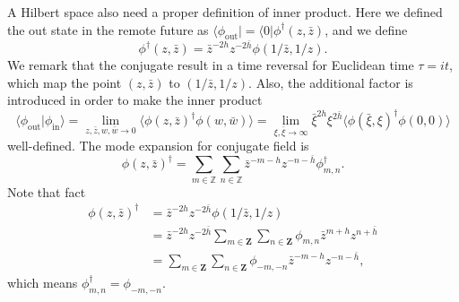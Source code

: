 \documentclass[aps,prb,superscriptaddress,nofootinbib]{revtex4}
\begin{document}
A Hilbert space also need a proper definition of inner product.
Here we defined the out state in the remote future as $\langle\phi_{\mathrm{out}}| = \langle 0| \phi^\dagger(z,\bar z)$, and we define
\begin{equation}
	\phi^\dagger(z,\bar z) =  \bar z^{-2h} z^{-2\bar h} \phi\left(1/\bar z, 1/z\right).
\end{equation}
We remark that the conjugate result in a time reversal for Euclidean time $\tau = it$, which map the point $(z,\bar z)$ to $(1/\bar z, 1/z)$.
Also, the additional factor is introduced in order to make the inner product
\begin{equation}
	\langle \phi_{\mathrm{out}}|\phi_{\mathrm{in}}\rangle = \lim_{z,\bar z,w,\bar w \rightarrow 0} \langle \phi(z,\bar z)^\dagger \phi(w,\bar w)\rangle
	= \lim_{\xi,\bar \xi\rightarrow \infty} \bar\xi^{2h}\xi^{2\bar h} \langle \phi(\bar\xi,\xi)^\dagger \phi(0,0)\rangle
\end{equation}
well-defined.
The mode expansion for conjugate field is
\begin{equation}
	\phi(z, \bar{z})^{\dagger}=\sum_{m \in \mathbb{Z}} \sum_{n \in \mathbb{Z}} \bar{z}^{-m-h} z^{-n-\bar{h}} \phi_{m, n}^{\dagger}.
\end{equation}
Note that fact
\begin{equation}
\begin{aligned}
	\phi(z, \bar{z})^{\dagger} &=\bar{z}^{-2 h} z^{-2 \bar{h}} \phi(1 / \bar{z}, 1 / z) \\
	&=\bar{z}^{-2 h} z^{-2 \bar{h}} \sum_{m \in \mathbf{Z}} \sum_{n \in \mathbf{Z}} \phi_{m, n} \bar{z}^{m+h} z^{n+\bar{h}} \\
	&=\sum_{m \in \mathbf{Z}} \sum_{n \in \mathbf{Z}} \phi_{-m,-n} \bar{z}^{-m-h} z^{-n-\bar{h}},
\end{aligned}
\end{equation}
which means $\phi^\dagger_{m,n} = \phi_{-m,-n}$.
\end{document}
